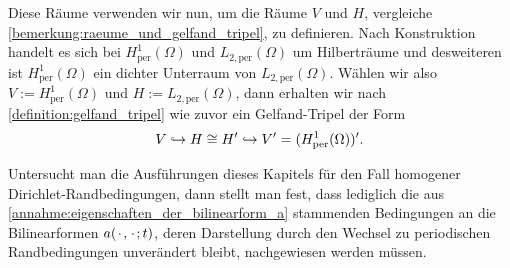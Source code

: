 \documentclass[../main.tex]{subfiles}
\begin{document}
Diese Räume verwenden wir nun, um die Räume $V$ und $H$, vergleiche \cref{bemerkung:raeume_und_gelfand_tripel}, zu definieren.
Nach Konstruktion handelt es sich bei $H^{1}_{\text{per}}(\Omega)$ und $L_{2,\text{per}}(\Omega)$ um Hilberträume und desweiteren ist $H^{1}_{\text{per}}(\Omega)$ ein dichter Unterraum von $L_{2,\text{per}}(\Omega)$.
Wählen wir also $V := H^{1}_{\text{per}}(\Omega)$ und $H := L_{2,\text{per}}(\Omega)$, dann erhalten wir nach \cref{definition:gelfand_tripel} wie zuvor ein Gelfand-Tripel der Form
\begin{equation}
    V \hookrightarrow H \cong H' \hookrightarrow V' = (H^{1}_{\text{per}}(\Omega))'.
\end{equation}

Untersucht man die Ausführungen dieses Kapitels für den Fall homogener Dirichlet-Randbedingungen, dann stellt man fest, dass lediglich die aus \cref{annahme:eigenschaften_der_bilinearform_a} stammenden Bedingungen an die Bilinearformen $a({\mkern2mu\cdot\mkern2mu}, {\mkern2mu\cdot\mkern2mu}; t)$, deren Darstellung durch den Wechsel zu periodischen Randbedingungen unverändert bleibt, nachgewiesen werden müssen.
\end{document}
